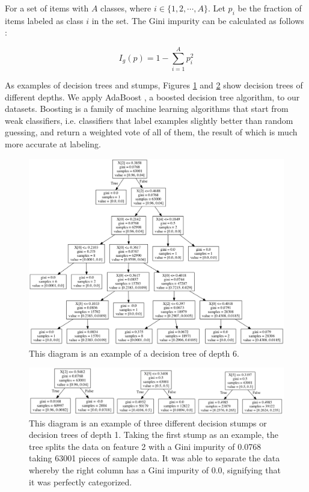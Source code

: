\documentclass[5p]{elsarticle}
\begin{document}
For a set of items with $A$ classes, where $i \in \{ 1, 2, \cdots , A \} $. Let $p_i$ be the fraction of items labeled as class $i$ in the set. The Gini impurity can be calculated as follows \cite{twelve}:

\begin{equation} I_g(p)=1-\sum_{i=1}^{A}p_i^2 
\end{equation}

As examples of decision trees and stumps, Figures \ref{fig:tree} and \ref{fig:stumps} show decision trees of different depths.	
We apply AdaBoost \cite{fourteen}, a boosted decision tree algorithm, to our datasets. Boosting is a family of machine learning algorithms that start from weak classifiers, i.e. classifiers that label examples slightly better than random guessing, and return a weighted vote of all of them, the result of which is much more accurate at labeling.

\begin{figure}[htbp]
    \centering
    \includegraphics[width=\linewidth]{tree.png}
    \caption{This diagram is an example of a decision tree of depth 6.}
    \label{fig:tree}
\end{figure}

\begin{figure}[htbp]
    \centering
    \includegraphics[width=\linewidth]{stumps.png}
    \caption{This diagram is an example of three different decision stumps or decision trees of depth 1. Taking the first stump as an example, the tree splits the data on feature 2 with a Gini impurity of 0.0768 taking 63001 pieces of sample data. It was able to separate the data whereby the right column has a Gini impurity of 0.0, signifying that it was perfectly categorized.}
    \label{fig:stumps}
\end{figure}
\end{document}
